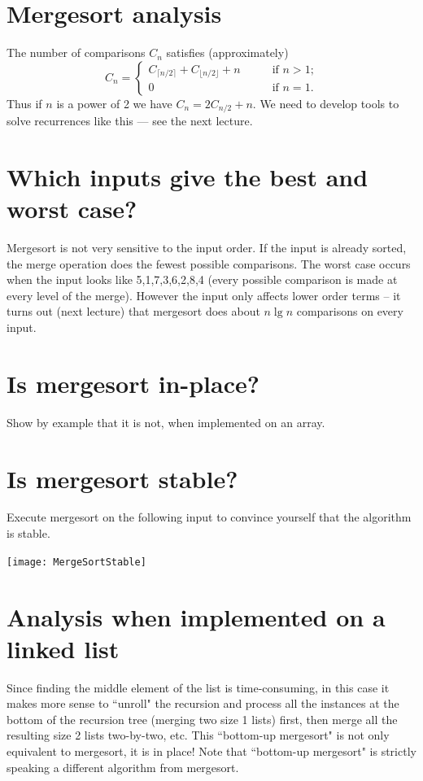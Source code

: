 \section{Mergesort analysis}
The number of comparisons $C_n$ satisfies (approximately)
$$ C_n  = \left\{
\begin{array}{ll}
	C_{\lceil n/2 \rceil} + C_{\lfloor n/2 \rfloor} + n & \qquad \text{if }n > 1\text{;} \\
														0 & \qquad \text{if }n = 1\text{.}
\end{array}\right.$$
Thus if $n$ is a power of 2 we have $C_n = 2C_{n/2} + n$. We need to develop tools to solve recurrences like this --- see the next lecture.

\section{Which inputs give the best and worst case?}
Mergesort is not very sensitive to the input order. 
If the input is already sorted, the merge operation does the fewest possible comparisons. 
The worst case occurs when the input looks like 5,1,7,3,6,2,8,4 (every possible comparison is made at every level of the merge). 
However the input only affects lower order terms -- it turns out 
(next lecture)  that mergesort does about $n \lg n$ comparisons on every input.

\section{Is mergesort in-place?}
\begin{Boxample}[4]
Show by example that it is not, when implemented on an array.
\end{Boxample}

\section{Is mergesort stable?}

\begin{Boxample}[0]
Execute mergesort on the following input to convince yourself that the algorithm is stable.
\begin{center}
\texttt{[image: MergeSortStable]} 
\end{center} 
\end{Boxample}

\section{Analysis when implemented on a linked list}
Since finding the middle element of the list is time-consuming, in this case it makes more sense to ``unroll" the recursion 
and process all the instances at the bottom of the recursion tree (merging two size 1 lists) first, then merge all the resulting size 2 lists two-by-two, etc. 
This ``bottom-up mergesort" is not only equivalent to mergesort, it is in place! Note that ``bottom-up mergesort" is strictly speaking a different algorithm from mergesort.


